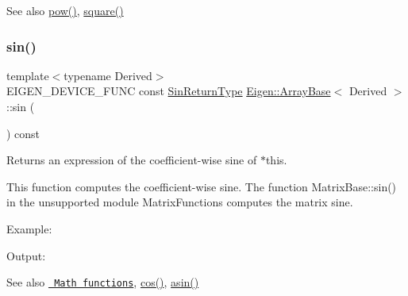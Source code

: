 \begin{DoxySeeAlso}{See also}
\mbox{\hyperlink{class_eigen_1_1_array_base_ab6dc101d82e8228a19a8840e3a29c1c9}{pow()}}, \mbox{\hyperlink{class_eigen_1_1_array_base_a95c818b933d73944c53bf0226ea106c8}{square()}} 
\end{DoxySeeAlso}
\mbox{\label{class_eigen_1_1_array_base_a8f857f93533ac386282f47c5ef05459a}} 
\subsubsection{\texorpdfstring{sin()}{sin()}}
{\footnotesize\ttfamily template$<$typename Derived$>$ \\
E\+I\+G\+E\+N\+\_\+\+D\+E\+V\+I\+C\+E\+\_\+\+F\+U\+NC const \mbox{\hyperlink{class_eigen_1_1_cwise_unary_op}{Sin\+Return\+Type}} \mbox{\hyperlink{class_eigen_1_1_array_base}{Eigen\+::\+Array\+Base}}$<$ Derived $>$\+::sin (\begin{DoxyParamCaption}{ }\end{DoxyParamCaption}) const\hspace{0.3cm}{\ttfamily [inline]}}

\begin{DoxyReturn}{Returns}
an expression of the coefficient-\/wise sine of $\ast$this.
\end{DoxyReturn}
This function computes the coefficient-\/wise sine. The function Matrix\+Base\+::sin() in the unsupported module Matrix\+Functions computes the matrix sine.

Example\+: 
\begin{DoxyCodeInclude}{0}
\end{DoxyCodeInclude}
 Output\+: 
\begin{DoxyVerbInclude}
\end{DoxyVerbInclude}


\begin{DoxySeeAlso}{See also}
\href{group__CoeffwiseMathFunctions.html\#cwisetable_sin}{\texttt{ Math functions}}, \mbox{\hyperlink{class_eigen_1_1_array_base_abe1bff4421b16e62e75f932b83c4d31f}{cos()}}, \mbox{\hyperlink{class_eigen_1_1_array_base_a6d090b549b70fcb9468d16341c2204f2}{asin()}} 
\end{DoxySeeAlso}
\mbox{\label{class_eigen_1_1_array_base_a0984c5e3b76efa0c66a754ea7106f5b9}} 
